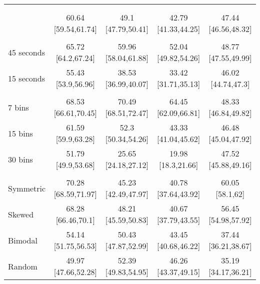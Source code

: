 
\begin{tabular}[t]{lcccc}
\toprule
{} &  &  &  &  \\
\cmidrule(l{3pt}r{3pt}){2-2} \cmidrule(l{3pt}r{3pt}){3-3} \cmidrule(l{3pt}r{3pt}){4-4} \cmidrule(l{3pt}r{3pt}){5-5}
\addlinespace[0.3em]
\\
\hspace{1em} & 60.64 [59.54,61.74] & 49.1 [47.79,50.41] & 42.79 [41.33,44.25] & 47.44 [46.56,48.32]\\
\addlinespace[0.3em]
\\
\hspace{1em}45 seconds & 65.72 [64.2,67.24] & 59.96 [58.04,61.88] & 52.04 [49.82,54.26] & 48.77 [47.55,49.99]\\
\hspace{1em}15 seconds & 55.43 [53.9,56.96] & 38.53 [36.99,40.07] & 33.42 [31.71,35.13] & 46.02 [44.74,47.3]\\
\addlinespace[0.3em]
\\
\hspace{1em}7 bins & 68.53 [66.61,70.45] & 70.49 [68.51,72.47] & 64.45 [62.09,66.81] & 48.33 [46.84,49.82]\\
\hspace{1em}15 bins & 61.59 [59.9,63.28] & 52.3 [50.34,54.26] & 43.33 [41.04,45.62] & 46.48 [45.04,47.92]\\
\hspace{1em}30 bins & 51.79 [49.9,53.68] & 25.65 [24.18,27.12] & 19.98 [18.3,21.66] & 47.52 [45.88,49.16]\\
\addlinespace[0.3em]
\\
\hspace{1em}Symmetric & 70.28 [68.59,71.97] & 45.23 [42.49,47.97] & 40.78 [37.64,43.92] & 60.05 [58.1,62]\\
\hspace{1em}Skewed & 68.28 [66.46,70.1] & 48.21 [45.59,50.83] & 40.67 [37.79,43.55] & 56.45 [54.98,57.92]\\
\hspace{1em}Bimodal & 54.14 [51.75,56.53] & 50.43 [47.87,52.99] & 43.45 [40.68,46.22] & 37.44 [36.21,38.67]\\
\hspace{1em}Random & 49.97 [47.66,52.28] & 52.39 [49.83,54.95] & 46.26 [43.37,49.15] & 35.19 [34.17,36.21]\\
\bottomrule
\end{tabular}
